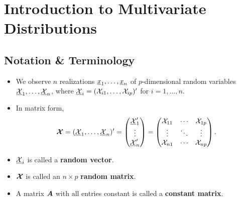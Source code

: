 \section{Introduction to Multivariate Distributions}
\subsection*{Notation \& Terminology}
\begin{itemize}
      \item We observe $ n $ realizations $ \underline{x}_1,\ldots,\underline{x}_n $ of $ p $-dimensional
            random variables $ \underline{\mathcal{X}}_1,\ldots,\underline{\mathcal{X}}_n $, where $ \underline{\mathcal{X}}_i=(\mathcal{X}_{i1},\ldots,\mathcal{X}_{ip})' $
            for $ i=1,\ldots,n $.
      \item In matrix form,
            \[ \bm{\mathcal{X}}=(\underline{\mathcal{X}}_1,\ldots,\underline{\mathcal{X}}_n)'=
                  \begin{pmatrix}
                        \underline{\mathcal{X}}_1' \\
                        \vdots         \\
                        \underline{\mathcal{X}}_n'
                  \end{pmatrix}=\begin{pmatrix}
                        \mathcal{X}_{11} & \cdots & \mathcal{X}_{1p} \\
                        \vdots      & \ddots & \vdots      \\
                        \mathcal{X}_{n1} & \cdots & \mathcal{X}_{np}
                  \end{pmatrix}. \]
      \item $ \underline{\mathcal{X}}_i $ is called a \textbf{random vector}.
      \item $ \bm{\mathcal{X}} $ is called an $ n\times p $ \textbf{random matrix}.
      \item A matrix $ \bm{A} $ with all entries constant is called a \textbf{constant matrix}.
\end{itemize}
